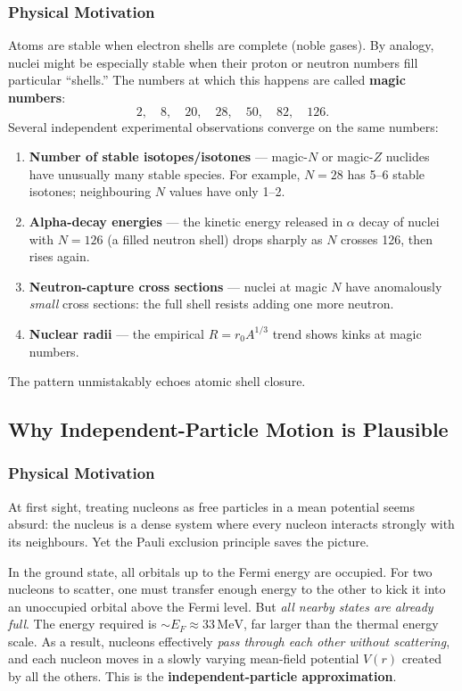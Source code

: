 \subsubsection*{Physical Motivation}
Atoms are stable when electron shells are complete (noble gases).  By analogy,
nuclei might be especially stable when their proton or neutron numbers fill
particular ``shells.''  The numbers at which this happens are called
\textbf{magic numbers}:
\begin{equation}
  \label{eq:lec04:magic}
  \boxed{2,\quad 8,\quad 20,\quad 28,\quad 50,\quad 82,\quad 126.}
\end{equation}
Several independent experimental observations converge on the same numbers:
\begin{enumerate}
  \item \textbf{Number of stable isotopes/isotones} — magic-$N$ or magic-$Z$
    nuclides have unusually many stable species.  For example, $N=28$ has
    5--6 stable isotones; neighbouring $N$ values have only 1--2.
  \item \textbf{Alpha-decay energies} — the kinetic energy released in $\alpha$
    decay of nuclei with $N=126$ (a filled neutron shell) drops sharply as
    $N$ crosses 126, then rises again.
  \item \textbf{Neutron-capture cross sections} — nuclei at magic $N$ have
    anomalously \emph{small} cross sections: the full shell resists adding one
    more neutron.
  \item \textbf{Nuclear radii} — the empirical $R=r_0 A^{1/3}$ trend shows
    kinks at magic numbers.
\end{enumerate}
The pattern unmistakably echoes atomic shell closure.

\subsection{Why Independent-Particle Motion is Plausible}

\subsubsection*{Physical Motivation}
At first sight, treating nucleons as free particles in a mean potential seems
absurd: the nucleus is a dense system where every nucleon interacts strongly
with its neighbours.  Yet the Pauli exclusion principle saves the picture.

In the ground state, all orbitals up to the Fermi energy are occupied.  For two
nucleons to scatter, one must transfer enough energy to the other to kick it
into an unoccupied orbital above the Fermi level.  But \emph{all nearby states
are already full}.  The energy required is $\sim E_F\approx33\,\mathrm{MeV}$,
far larger than the thermal energy scale.  As a result, nucleons effectively
\emph{pass through each other without scattering}, and each nucleon moves in
a slowly varying mean-field potential $V(r)$ created by all the others.  This
is the \textbf{independent-particle approximation}.

